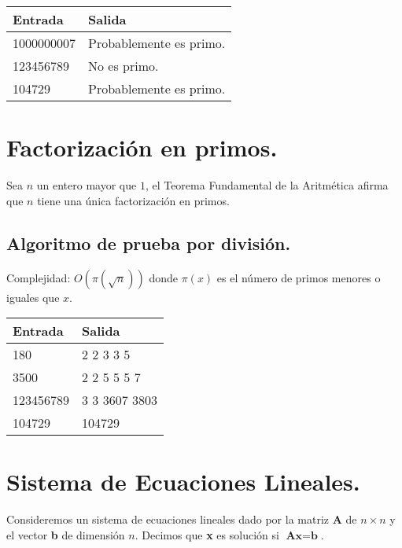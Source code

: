 \documentclass[12pt, letterpaper, twoside]{article}
\begin{document}
 \medskip

\begin{tabular}{|p{7cm}|p{7cm}|}
\hline
\textbf{Entrada} & \textbf{Salida}\\ \hline
1000000007 & Probablemente es primo.\\
123456789  & No es primo.\\
104729     & Probablemente es primo.\\ \hline
\end{tabular}

\newpage

\section{Factorización en primos.}

Sea $n$ un entero mayor que $1$, el Teorema Fundamental de la Aritmética afirma que $n$ tiene una única factorización en primos.

\subsection{Algoritmo de prueba por división.}

Complejidad: $O\left(\pi\left(\sqrt{n}\right)\right)$ donde $\pi(x)$ es el número de primos menores o iguales que $x$.

 \medskip

\begin{tabular}{|p{7cm}|p{7cm}|}
\hline
\textbf{Entrada} & \textbf{Salida}\\ \hline
180   & 2 2 3 3 5\\
3500  & 2 2 5 5 5 7\\ 
123456789 & 3 3 3607 3803\\
104729 & 104729\\ \hline
\end{tabular}

\newpage

\section{Sistema de Ecuaciones Lineales.}

Consideremos un sistema de ecuaciones lineales dado por la matriz \textbf{A} de $n \times n$ y el vector \textbf{b} de dimensión $n$. Decimos que \textbf{x} es solución si $\textbf{Ax} = \textbf{b}$.
\end{document}
